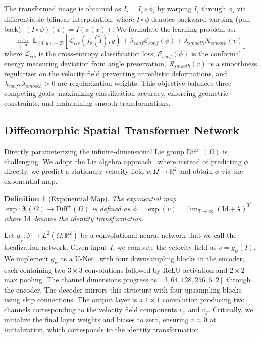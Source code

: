 \documentclass[final,3p,times,review,sort&compress]{elsarticle}
\newtheorem{definition}{Definition}
\begin{document}
The transformed image is obtained as $\tilde{I}_i = I_i \circ \phi_i$ by warping $I_i$ through $\phi_i$ via differentiable bilinear interpolation, where $I \circ \phi$ denotes backward warping (pull-back): $(I \circ \phi)(x) = I(\phi(x))$. We formulate the learning problem as:
\begin{equation}
\min_{\psi, \theta} \; \mathbb{E}_{(I,y) \sim \mathcal{D}} \left[ \mathcal{L}_{cls}(f_\theta(\tilde{I}), y) + \lambda_{conf} \mathcal{E}_{conf}(\phi) + \lambda_{smooth} \mathcal{R}_{smooth}(v) \right]
\label{eq:objective}
\end{equation}
where $\mathcal{L}_{cls}$ is the cross-entropy classification loss, $\mathcal{E}_{conf}(\phi)$ is the conformal energy measuring deviation from angle preservation, $\mathcal{R}_{smooth}(v)$ is a smoothness regularizer on the velocity field preventing unrealistic deformations, and $\lambda_{conf}, \lambda_{smooth} > 0$ are regularization weights. This objective balances three competing goals: maximizing classification accuracy, enforcing geometric constraints, and maintaining smooth transformations.

\subsection{Diffeomorphic Spatial Transformer Network}

Directly parameterizing the infinite-dimensional Lie group $\text{Diff}^+(\Omega)$ is challenging. We adopt the Lie algebra approach~\cite{arsigny2006logdiff,voxelmorph} where instead of predicting $\phi$ directly, we predict a stationary velocity field $v: \Omega \rightarrow \mathbb{R}^2$ and obtain $\phi$ via the exponential map.

\begin{definition}[Exponential Map]
\label{def:exp_map}
The exponential map $\exp: \mathfrak{X}(\Omega) \rightarrow \text{Diff}^+(\Omega)$ is defined as $\phi = \exp(v) = \lim_{T \rightarrow \infty} \left( \text{Id} + \frac{v}{T} \right)^T$ where $\text{Id}$ denotes the identity transformation.
\end{definition}

Let $g_\psi: \mathcal{I} \rightarrow L^2(\Omega, \mathbb{R}^2)$ be a convolutional neural network that we call the localization network. Given input $I$, we compute the velocity field as $v = g_\psi(I)$. We implement $g_\psi$ as a U-Net~\cite{ronneberger2015unet} with four downsampling blocks in the encoder, each containing two $3 \times 3$ convolutions followed by ReLU activation and $2 \times 2$ max pooling. The channel dimensions progress as $[3, 64, 128, 256, 512]$ through the encoder. The decoder mirrors this structure with four upsampling blocks using skip connections. The output layer is a $1 \times 1$ convolution producing two channels corresponding to the velocity field components $v_x$ and $v_y$. Critically, we initialize the final layer weights and biases to zero, ensuring $v \approx 0$ at initialization, which corresponds to the identity transformation.
\end{document}
